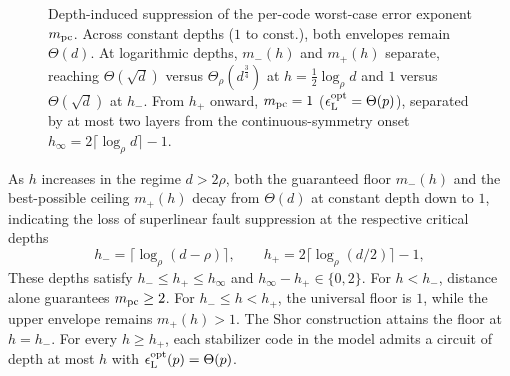 \documentclass[aps,prl,reprint,notitlepage,nofootinbib,nobibnotes]{revtex4-2}
\begin{document}
\begin{figure}[htb]
{%
}
\caption{Depth-induced suppression of the per-code worst-case error exponent $m_{\rm pc}$. Across
constant depths ($1$ to $\mathrm{const.}$), both envelopes remain $\Theta(d)$. At logarithmic
depths, $m_-(h)$ and $m_+(h)$ separate, reaching $\Theta(\sqrt d)$ versus
$\Theta_\rho(d^{\frac34})$ at $h=\tfrac{1}{2}\log_\rho d$ and $1$ versus $\Theta(\sqrt d)$ at
$h_-$. From $h_+$ onward, $m_{\rm pc}=1$ ($\epsilon_{\rm L}^{\rm opt}=\Theta(p)$), separated by at
most two layers from the continuous-symmetry onset $h_\infty=2\lceil\log_\rho d\rceil-1$.}
\label{fig:depth-noise-symmetry}
\end{figure}

As $h$ increases in the regime $d> 2\rho$, both the guaranteed floor $m_-(h)$ and the best-possible ceiling $m_+(h)$ decay from $\Theta(d)$ at constant depth down to $1$, indicating the loss of superlinear fault suppression at the respective critical depths
\begin{equation}\label{eq:discussion-exponent-depths}
 h_- = \lceil\log_\rho(d-\rho)\rceil,\qquad
 h_+ = 2\lceil\log_\rho(d/2)\rceil-1,
\end{equation}
These depths satisfy $h_-\le h_+\le h_\infty$ and
$h_\infty-h_+\in\{0,2\}$.
For $h<h_-$, distance alone guarantees $m_{\rm pc}\ge2$.
For $h_-\le h<h_+$, the universal floor is $1$, while the upper
envelope remains $m_+(h)>1$.
The Shor construction attains the floor at $h=h_-$.
For every $h\ge h_+$, each stabilizer code in the model
admits a circuit of depth at most $h$ with
$\epsilon_{\rm L}^{\rm opt}(p)=\Theta(p)$.
\end{document}

